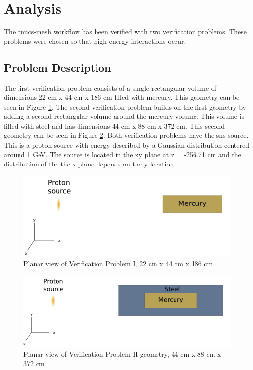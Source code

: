 \section{Analysis}\label{sc:analysis}
The rnucs-mesh workflow has been verified with two verification problems.
These problems were chosen so that high energy interactions occur.

\subsection{Problem Description}
The first verification problem consists of a single rectangular volume of
dimensions 22 cm x 44 cm x 186 cm filled with mercury. This geometry can be seen
in Figure \ref{fig:VPI}. The second verification problem builds on the first
geometry by adding a second rectangular volume around the mercury volume.
This volume is filled with steel and has dimensions 44 cm x 88 cm x 372 cm.
This second geometry can be seen in Figure \ref{fig:VPII}.
Both verification problems have the \gls{sns} source. This is a proton source
with energy described by a Gaussian distribution centered around 1 GeV.
The source is located in the xy
plane at z = -256.71 cm and the distribution of the the x plane depends on the
y location.
%
\begin{figure}[h!]
	\centering
	\includegraphics[scale=0.7]{../figs/mercury.png}
	\caption[VPI]{Planar view of Verification Problem I, 22 cm  x 44 cm x 186 cm}
	\label{fig:VPI}
\end{figure}
%
\begin{figure}[h!]
	\centering
	\includegraphics[scale=0.71]{../figs/mer_steel.png}
	\caption[VPI]{Planar view of Verification Problem II geometry, 44 cm x 88 cm x 372 cm}
	\label{fig:VPII}
\end{figure}
%
